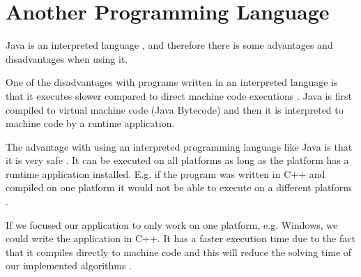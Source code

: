\section{Another Programming Language}
Java is an interpreted language \cite{javanotes}, and therefore there is some advantages and disadvantages when using it.

One of the disadvantages with programs written in an interpreted language is that it executes slower compared to direct machine code executions \cite{programmingLanguages}.
Java is first compiled to virtual machine code (Java Bytecode) and then it is interpreted to machine code by a runtime application.

The advantage with using an interpreted programming language like Java is that it is very safe \cite{javanotes}.
It can be executed on all platforms as long as the platform has a runtime application installed. 
E.g. if the program was written in C++ and compiled on one platform it would not be able to execute on a different platform \cite{programmingLanguages}.

If we focused our application to only work on one platform, e.g. Windows, we could write the application in C++.
It has a faster execution time due to the fact that it compiles directly to machine code and this will reduce the solving time of our implemented algorithms \cite{programmingLanguages}. 
